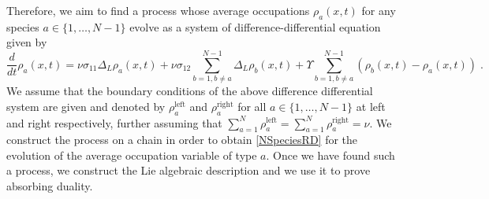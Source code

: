 \documentclass[10pt]{article}
\numberwithin{equation}{section}
\numberwithin{equation}{subsection}
\newcommand{\dt}{\;.}
\begin{document}
Therefore, we aim to find a process whose average occupations $\rho_{a}(x,t)$ for any species $a\in\{1,\ldots,N-1\}$ evolve as a system of difference-differential equation given by 
\begin{equation}\label{NSpeciesRD}
	\frac{d}{dt} \rho_{a}(x,t)=\nu\sigma_{11}\Delta_{L}\rho_{a}(x,t)+\nu\sigma_{12}\sum_{b=1,b\neq a}^{N-1}\Delta_{L}\rho_{b}(x,t)+\Upsilon\sum_{b=1,b\neq a}^{N-1}\left(\rho_{b}(x,t)-\rho_{a}(x,t)\right)\dt
\end{equation} 
 We assume that the boundary conditions of the above difference differential system are given and denoted by $\rho_{a}^{\text{left}}$ and $\rho_{a}^{\text{right}}$ for all $a\in\{1,\ldots,N-1\}$ at left and right respectively, further assuming that $\sum_{a=1}^{N}\rho_{a}^{\text{left}}=\sum_{a=1}^{N}\rho_{a}^{\text{right}}=\nu$.
 We construct the process on a chain in order to obtain \eqref{NSpeciesRD} for the evolution of the average occupation variable of type $a$. Once we have found such a process, we construct the Lie algebraic description and we use it to prove absorbing duality.
\end{document}
